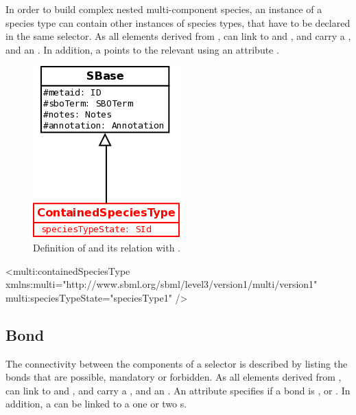 In order to build complex nested multi-component species, an instance of a species type can contain other instances of species types, that have to be declared in the same selector. As all elements derived from ,  can link to  and , and carry a , and an . In addition, a  points to the relevant  using an attribute . 

\begin{figure}[H]
\begin{center}
\includegraphics[scale=0.3]{figs/pngs/ContainedSpeciesTypeClass.png} 
\caption{Definition of  and its relation with .}
\label{fig:ContainedSpeciesTypeClass}
\end{center}
\end{figure}

\begin{example}
<multi:containedSpeciesType 
             xmlns:multi="http://www.sbml.org/sbml/level3/version1/multi/version1" 
             multi:speciesTypeState="speciesType1" />
\end{example}

\subsection{Bond}

The connectivity between the components of a selector is described by listing the bonds that are possible, mandatory or forbidden. As all elements derived from ,  can link to  and , and carry a , and an . An attribute  specifies if a bond is ,  or . In addition, a  can be linked to a one or two s.

